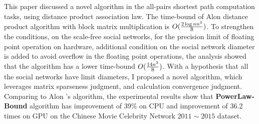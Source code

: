 \documentclass[10pt,twocolumn,letterpaper]{article}
\begin{document}
This paper discussed a novel algorithm in the all-pairs shortest path computation tasks, using distance product association law.
The time-bound of Alon \etal distance product algorithm with block matrix multiplication is \(O({2\log{n}n^3\over \Bbb B})\).
To strengthen the conditions, on the scale-free social networks, for the precision limit of floating point operation on hardware,
additional condition on the social network diameter is added to avoid overflow in the floating point operations,
the analysis showed that the algorithm has a lower time-bound \(O({14n^3\over \Bbb B})\).
With a hypothesis that all the social networks have limit diameters, I proposed a novel algorithm,
which leverages matrix sparseness judgment, and calculation convergence judgment.
Comparing to Alon \etal's algorithm, the experimental results show that \textbf{PowerLaw-Bound} algorithm
has improvement of 39\% on CPU and improvement of 36.2 times on GPU on the Chinese Movie Celebrity Network $2011\sim2015$ dataset.
\end{document}
